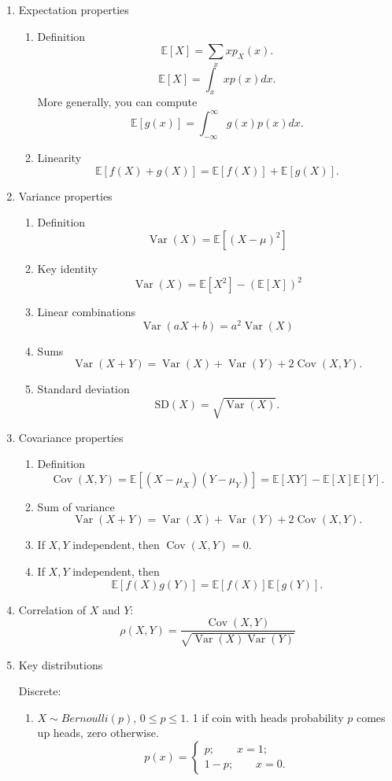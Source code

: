 \documentclass{article}
\newcommand{\EE}{\mathbb{E}}
\DeclareMathOperator{\Var}{Var}
\DeclareMathOperator{\Cov}{Cov}
\begin{document}
\begin{enumerate}
  \item Expectation properties
    \begin{enumerate}
      \item Definition
        \[
          \EE[X] = \sum_{x} x p_X(x).
        \]
        \[
          \EE[X] = \int_{x} x p(x) dx.
        \]
        More generally, you can compute
        \[
          \EE[g(x)] = \int_{-\infty}^{\infty} g(x) p(x) dx.
        \]
      \item Linearity
        \[
          \EE[f(X) + g(X)] = \EE[f(X)] + \EE[g(X)].
        \]
    \end{enumerate}
  \item Variance properties
    \begin{enumerate}
      \item Definition
          \[
            \Var(X) = \EE[(X - \mu)^2]
          \]
      \item Key identity
          \[
            \Var(X) = \EE[X^2] - (\EE[X])^2
          \]
      \item Linear combinations
          \[
            \Var(aX + b) = a^2 \Var(X)
          \]
      \item Sums
        \[
          \Var(X + Y) = \Var(X) + \Var(Y) + 2 \Cov(X, Y).
        \]
      \item Standard deviation
        \[
          \text{SD}(X) = \sqrt{\Var(X)}.
        \]
    \end{enumerate}
  \item Covariance properties
    \begin{enumerate}
      \item Definition
        \[
          \Cov(X, Y) = \EE[(X - \mu_X) (Y - \mu_Y)] = \EE[XY] - \EE[X] \EE[Y].
        \]
      \item Sum of variance
        \[
          \Var(X+Y) = \Var(X) + \Var(Y) + 2 \Cov(X, Y).
        \]
      \item If $X, Y$ independent, then $\Cov(X, Y) = 0$.
      \item If $X, Y$ independent, then
        \[
          \EE[f(X) g(Y)] = \EE[f(X)] \EE[g(Y)].
        \]
    \end{enumerate}
  \item Correlation of $X$ and $Y$:
    \[
      \rho(X, Y) = \frac{\Cov(X, Y)}{\sqrt{\Var(X) \Var(Y)}}
    \]
  \item Key distributions

    Discrete: 

    \begin{enumerate}
      \item $X \sim Bernoulli(p)$, $0 \leq p \leq 1$.  1 if coin with heads probability $p$ comes up heads, zero otherwise.
        \[
          p(x) = 
          \begin{cases}
            p; \qquad x = 1; \\
            1-p; \qquad x = 0.
          \end{cases}
        \]


\end{enumerate}
\end{enumerate}
\end{document}
